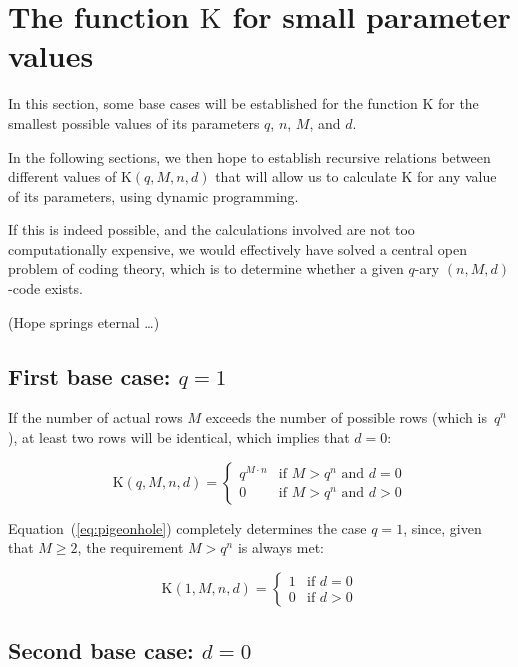 \documentclass[a4paper]{article}
\newcommand{\codecount}{\mathrm{K}}
\begin{document}
\section{The function $\codecount$ for small parameter values}
\label{sec:easy-results}

In this section, some base cases will be established for the function $\codecount$ for the smallest possible values of its parameters $q$, $n$, $M$, and $d$.

In the following sections, we then hope to establish recursive relations between different values of $\codecount(q,M,n,d)$ that will allow us to
calculate $\codecount$ for any value of its parameters, using dynamic programming.

If this is indeed possible, and the calculations involved are not too computationally expensive, we would effectively have solved a
central open problem of coding theory, which is to determine whether a given $q$-ary $(n,M,d)$-code exists.

(Hope springs eternal \ldots)

\subsection{First base case: $q=1$}

If the number of actual rows $M$ exceeds the number of possible rows (which is~$q^n$), at least two rows will be identical, which implies that $d=0$:

\begin{equation}
\codecount(q,M,n,d) = \left\{
\begin{array}{ll}
q^{M \cdot n} & \mbox{if $M > q^n$ and $d=0$} \\
0             & \mbox{if $M > q^n$ and $d>0$}
\end{array}
\right.
\label{eq:pigeonhole}
\end{equation}

Equation~(\ref{eq:pigeonhole}) completely determines the case $q=1$, since, given that $M \ge 2$, the requirement $M > q^n$ is always met:

\begin{equation}
\codecount(1,M,n,d) = \left\{
\begin{array}{ll}
1 & \mbox{if $d=0$} \\
0 & \mbox{if $d>0$}
\end{array}
\right.
\label{eq:pigeonhole-q1}
\end{equation}

\subsection{Second base case: $d=0$}
\end{document}
